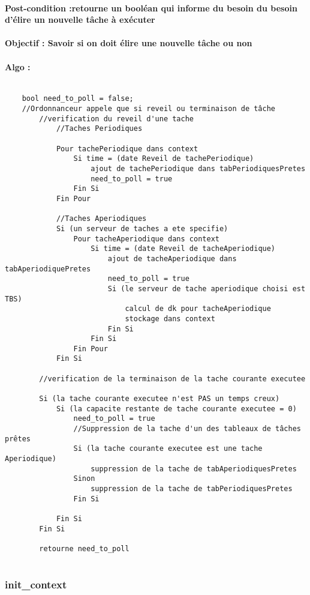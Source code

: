 				\paragraph{Post-condition :retourne un booléan qui informe du besoin du besoin d'élire un nouvelle tâche à exécuter} 
				\paragraph{Objectif : Savoir si on doit élire une nouvelle tâche ou non} 
				\paragraph{Algo :} 
					\begin{verbatim}
					
	bool need_to_poll = false;
	//Ordonnanceur appele que si reveil ou terminaison de tâche
		//verification du reveil d'une tache
			//Taches Periodiques
			
			Pour tachePeriodique dans context
				Si time = (date Reveil de tachePeriodique)
					ajout de tachePeriodique dans tabPeriodiquesPretes
					need_to_poll = true
				Fin Si
			Fin Pour
			
			//Taches Aperiodiques
			Si (un serveur de taches a ete specifie) 
				Pour tacheAperiodique dans context
					Si time = (date Reveil de tacheAperiodique)
						ajout de tacheAperiodique dans tabAperiodiquePretes
						need_to_poll = true
						Si (le serveur de tache aperiodique choisi est TBS)
							calcul de dk pour tacheAperiodique
							stockage dans context
						Fin Si
					Fin Si
				Fin Pour
			Fin Si
			
		//verification de la terminaison de la tache courante executee
		
		Si (la tache courante executee n'est PAS un temps creux)
			Si (la capacite restante de tache courante executee = 0)
				need_to_poll = true
				//Suppression de la tache d'un des tableaux de tâches prêtes
				Si (la tache courante executee est une tache Aperiodique)
					suppression de la tache de tabAperiodiquesPretes
				Sinon
					suppression de la tache de tabPeriodiquesPretes
				Fin Si
		
			Fin Si
		Fin Si
		
		retourne need_to_poll
				
					\end{verbatim}
				
			\subsubsection{init\_context}
